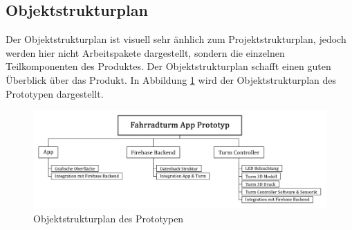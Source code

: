 \subsection{Objektstrukturplan}

Der Objektstrukturplan ist visuell sehr änhlich zum Projektstrukturplan, jedoch werden hier nicht Arbeitspakete dargestellt, sondern die einzelnen Teilkomponenten des Produktes. Der Objektstrukturplan schafft einen guten Überblick über das Produkt. In Abbildung \ref{fig:objektstrukturplan_prototyp} wird der Objektstrukturplan des Prototypen dargestellt. 

\begin{figure}[H]
    \centering
    \includegraphics[width=1\textwidth]{images/objektstrukturplan_prototyp}
    \caption{Objektstrukturplan des Prototypen}
    \label{fig:objektstrukturplan_prototyp}
\end{figure}
